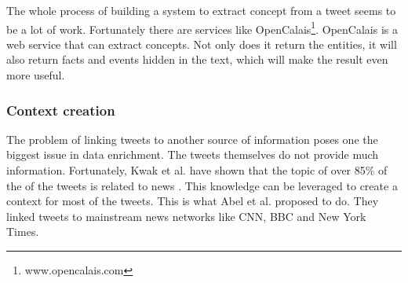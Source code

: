 \documentclass{article}
\begin{document}
The whole process of building a system to extract concept from a tweet seems to be a lot of work. Fortunately there are services like OpenCalais\footnote{www.opencalais.com}. OpenCalais is a web service that can extract concepts. Not only does it return the entities, it will also return facts and events hidden in the text, which will make the result even more useful.
\subsubsection{Context creation}
The problem of linking tweets to another source of information poses one the biggest issue in data enrichment. The tweets themselves do not provide much information. Fortunately, Kwak et al. have shown that the topic of over 85\% of the of the tweets is related to news \cite{newsmedia}. This knowledge can be leveraged to create a context for most of the tweets.  This is what Abel et al. proposed to do\cite{enrichmentForProfiling}. They linked tweets to mainstream news networks like CNN, BBC and New York Times.
\end{document}
